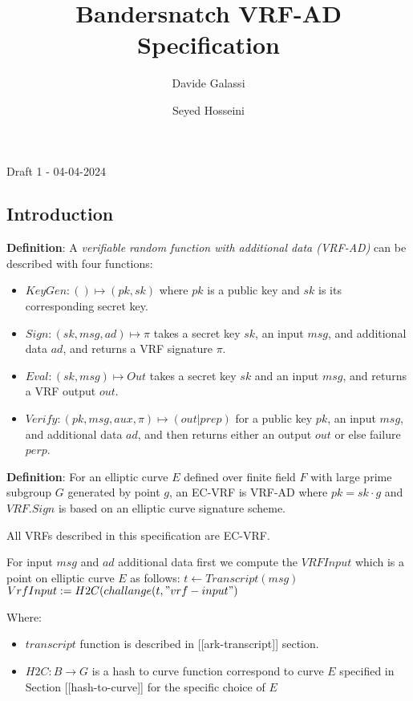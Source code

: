 \documentclass[
]{article}
\title{Bandersnatch VRF-AD Specification}
\author{Davide Galassi \and Seyed Hosseini}
\date{}
\providecommand{\tightlist}{%
  \setlength{\itemsep}{0pt}\setlength{\parskip}{0pt}}
\begin{document}
\maketitle

Draft 1 - 04-04-2024

\hypertarget{introduction}{%
\subsection{Introduction}\label{introduction}}

\textbf{Definition}: A \emph{verifiable random function with additional
data (VRF-AD)} can be described with four functions:

\begin{itemize}
\tightlist
\item
  \(KeyGen: () \mapsto (pk,sk)\) where \(pk\) is a public key and \(sk\)
  is its corresponding secret key.
\item
  \(Sign : (sk,msg,ad) \mapsto \pi\) takes a secret key \(sk\), an input
  \(msg\), and additional data \(ad\), and returns a VRF signature
  \(\pi\).
\item
  \(Eval : (sk, msg) \mapsto Out\) takes a secret key \(sk\) and an
  input \(msg\), and returns a VRF output \(out\).
\item
  \(Verify: (pk,msg,aux,\pi) \mapsto (out|prep)\) for a public key
  \(pk\), an input \(msg\), and additional data \(ad\), and then returns
  either an output \(out\) or else failure \(perp\).
\end{itemize}

\textbf{Definition}: For an elliptic curve \(E\) defined over finite
field \(F\) with large prime subgroup \(G\) generated by point \(g\), an
EC-VRF is VRF-AD where \(pk = sk \cdot g\) and \(VRF.Sign\) is based on
an elliptic curve signature scheme.

All VRFs described in this specification are EC-VRF.

For input \(msg\) and \(ad\) additional data first we compute the
\(VRFInput\) which is a point on elliptic curve \(E\) as follows:
\(t \leftarrow Transcript(msg)\)
\(VrfInput := H2C(challange(t, "vrf-input")\)

Where:

\begin{itemize}
\tightlist
\item
  \(transcript\) function is described in {[}{[}ark-transcript{]}{]}
  section.
\item
  \(H2C: B \rightarrow G\) is a hash to curve function correspond to
  curve \(E\) specified in Section {[}{[}hash-to-curve{]}{]} for the
  specific choice of \(E\)
\end{itemize}
\end{document}
